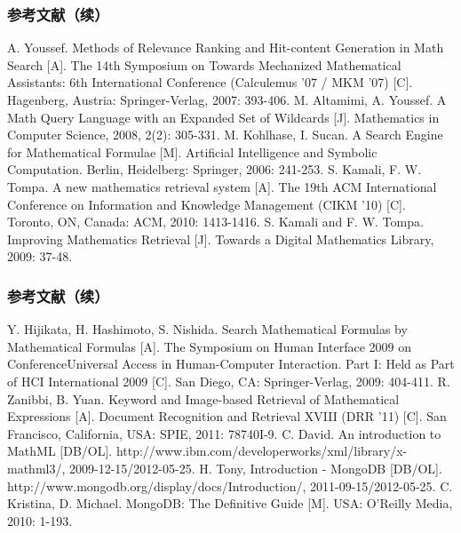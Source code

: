     \begin{frame}
        \frametitle{参考文献（续）}
        \vspace{-1.5cm}
        \begin{thebibliography}{}
             A. Youssef. Methods of Relevance Ranking and Hit-content Generation in Math Search [A]. The 14th Symposium on Towards Mechanized Mathematical Assistants: 6th International Conference (Calculemus '07 / MKM '07) [C]. Hagenberg, Austria: Springer-Verlag, 2007: 393-406.
             M. Altamimi, A. Youssef. A Math Query Language with an Expanded Set of Wildcards [J]. Mathematics in Computer Science, 2008, 2(2): 305-331.
             M. Kohlhase, I. Sucan. A Search Engine for Mathematical Formulae [M]. Artificial Intelligence and Symbolic Computation. Berlin, Heidelberg: Springer, 2006: 241-253.
             S. Kamali, F. W. Tompa. A new mathematics retrieval system [A]. The 19th ACM International Conference on Information and Knowledge Management (CIKM '10) [C]. Toronto, ON, Canada: ACM, 2010: 1413-1416.
             S. Kamali and F. W. Tompa. Improving Mathematics Retrieval [J]. Towards a Digital Mathematics Library, 2009: 37-48.
        \end{thebibliography}
    \end{frame}

    \begin{frame}
        \frametitle{参考文献（续）}
        \vspace{-1.5cm}
        \begin{thebibliography}{}
             Y. Hijikata, H. Hashimoto, S. Nishida. Search Mathematical Formulas by Mathematical Formulas [A]. The Symposium on Human Interface 2009 on ConferenceUniversal Access in Human-Computer Interaction. Part I: Held as Part of HCI International 2009 [C]. San Diego, CA: Springer-Verlag, 2009: 404-411.
             R. Zanibbi, B. Yuan. Keyword and Image-based Retrieval of Mathematical Expressions [A]. Document Recognition and Retrieval XVIII  (DRR '11) [C].  San Francisco, California, USA: SPIE, 2011: 78740I-9.
             C. David. An introduction to MathML [DB/OL]. http://www.ibm.com/developerworks/xml/library/x-mathml3/, 2009-12-15/2012-05-25.
             H. Tony, Introduction - MongoDB [DB/OL]. http://www.mongodb.org/display/docs/Introduction/, 2011-09-15/2012-05-25.
             C. Kristina, D. Michael. MongoDB: The Definitive Guide [M]. USA: O’Reilly Media, 2010: 1-193.
        \end{thebibliography}
    \end{frame}

    


